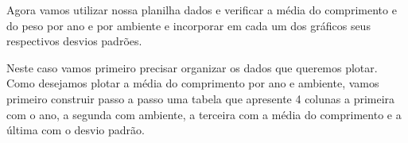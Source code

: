 \documentclass[titlepage, oneside, openany, a4paper]{book}
\newenvironment{Shaded}{\begin{snugshade}}{\end{snugshade}}
\newcommand{\DataTypeTok}[1]{\textcolor[rgb]{0.13,0.29,0.53}{#1}}
\newcommand{\FloatTok}[1]{\textcolor[rgb]{0.00,0.00,0.81}{#1}}
\newcommand{\KeywordTok}[1]{\textcolor[rgb]{0.13,0.29,0.53}{\textbf{#1}}}
\newcommand{\NormalTok}[1]{#1}
\newcommand{\OperatorTok}[1]{\textcolor[rgb]{0.81,0.36,0.00}{\textbf{#1}}}
\newcommand{\StringTok}[1]{\textcolor[rgb]{0.31,0.60,0.02}{#1}}
\begin{document}
Agora vamos utilizar nossa planilha dados e verificar a média do comprimento e do peso por ano e por ambiente e incorporar em cada um dos gráficos seus respectivos desvios padrões.

Neste caso vamos primeiro precisar organizar os dados que queremos plotar. Como desejamos plotar a média do comprimento por ano e ambiente, vamos primeiro construir passo a passo uma tabela que apresente 4 colunas a primeira com o ano, a segunda com ambiente, a terceira com a média do comprimento e a última com o desvio padrão.

\begin{Shaded}
\end{Shaded}
\end{document}
